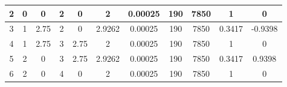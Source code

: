 \documentclass[12pt, a4papper, twoside]{article}
\begin{document}
\begin{table}[H]
\begin{tabular}{|c|c|c|c|c|c|c|c|c|c|c|}
2                                                                       & 0                                   & 0                                      & 2                                   & 0                                      & 2                                                                    & 0.00025                                                                & 190                                                                    & 7850                                                                                   & 1             & 0            \\ \hline
3                                                                       & 1                                   & 2.75                                   & 2                                   & 0                                      & 2.9262                                                               & 0.00025                                                                & 190                                                                    & 7850                                                                                   & 0.3417        & -0.9398      \\ \hline
4                                                                       & 1                                   & 2.75                                   & 3                                   & 2.75                                   & 2                                                                    & 0.00025                                                                & 190                                                                    & 7850                                                                                   & 1             & 0            \\ \hline
5                                                                       & 2                                   & 0                                      & 3                                   & 2.75                                   & 2.9262                                                               & 0.00025                                                                & 190                                                                    & 7850                                                                                   & 0.3417        & 0.9398       \\ \hline
6                                                                       & 2                                   & 0                                      & 4                                   & 0                                      & 2                                                                    & 0.00025                                                                & 190                                                                    & 7850                                                                                   & 1             & 0            \\ \hline

\end{tabular}
\end{table}
\end{document}
